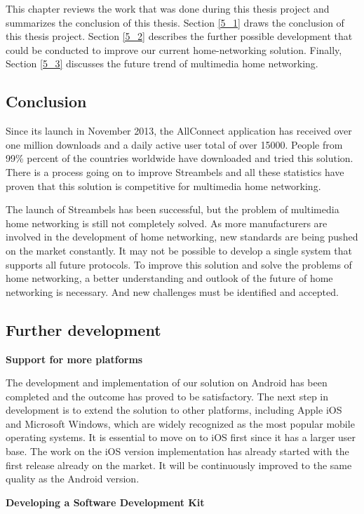 This chapter reviews the work that was done during this thesis project and
summarizes the conclusion of this thesis. Section \ref{5_1} draws the
conclusion of this thesis project. Section \ref{5_2} describes the further
possible development that could be conducted to improve our current
home-networking solution. Finally, Section \ref{5_3} discusses the future trend
of multimedia home networking.
\subsection{Conclusion\label{5_1}}
Since its launch in November 2013, the AllConnect application has received over
one million downloads and a daily active user total of over 15000. People from 99\%
percent of the countries worldwide have downloaded and tried this solution.
There is a process going on to improve Streambels and all these
statistics have proven that this solution is competitive for multimedia home
networking.

The launch of Streambels has been successful, but the problem of multimedia
 home networking is still not completely solved. As more manufacturers are
 involved in the development of home networking, new standards are being pushed
 on the market constantly. It may not be possible to develop a single
 system that supports all future protocols. To improve this solution and solve
 the problems of home networking, a better understanding and outlook of the
 future of home networking is necessary. And new challenges must be identified
 and accepted.

\subsection{Further development\label{5_2}}
\textbf{Support for more platforms}

The development and implementation of our solution on Android has been completed
and the outcome has proved to be satisfactory. The next step in development is
to extend the solution to other platforms, including Apple iOS and Microsoft
Windows, which are widely recognized as the most popular mobile operating
systems. It is essential to move on to iOS first since it has a larger user
base. The work on the iOS version implementation has already started with the
first release already on the market. It will be continuously improved
to the same quality as the Android version.

\textbf{Developing a Software Development Kit}

